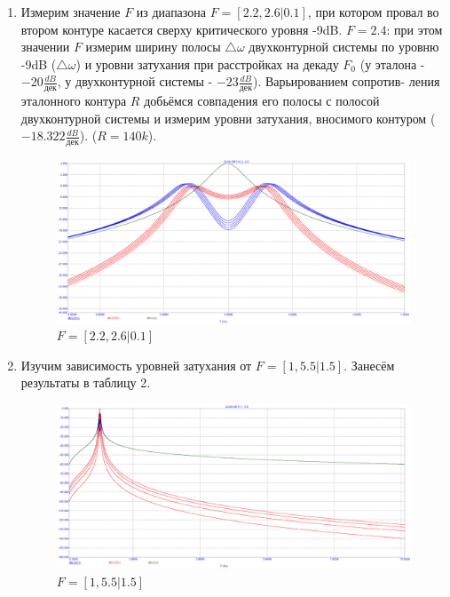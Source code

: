 \documentclass[a4paper, 14pt]{article}%
\begin{document}
\begin{enumerate}
\newpage

\item Измерим значение $F$ из диапазона $F = [2.2, 2.6 | 0.1]$, при котором провал во втором контуре касается сверху критического уровня -9dB. 
$F = 2.4$: при этом значении $F$ измерим ширину полосы $\bigtriangleup\omega$ двухконтурной системы по уровню -9dB ($\bigtriangleup \omega$) и уровни затухания при расстройках на декаду $F_0$ (у эталона - $-20 \frac{dB}{\text{дек}}$, у двухконтурной системы - $-23 \frac{dB}{\text{дек}}$). Варьированием сопротив-
ления эталонного контура $R$ добьёмся совпадения его полосы с полосой двухконтурной системы и измерим уровни затухания, вносимого контуром ($-18.322 \frac{dB}{\text{дек}}$). ($R = 140k$).

\begin{figure}[h!]
\centering
\includegraphics[scale = 0.4]{images/plot7_1.png}
\caption{$F = [2.2, 2.6 | 0.1]$}
\label{fig:Image1}
\end{figure}

\newpage

\item Изучим зависимость уровней затухания от $F = [1,5.5|1.5]$. Занесём
результаты в таблицу 2.

\begin{figure}[h!]
\centering
\includegraphics[scale = 0.4]{images/plot8_1.png}
\caption{$F = [1,5.5|1.5]$}
\label{fig:Image1}
\end{figure}


\end{enumerate}
\end{document}
